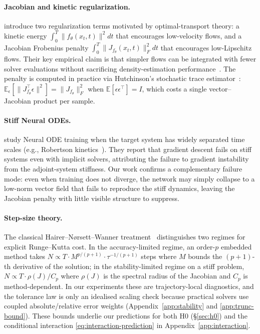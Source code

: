 \documentclass[11pt]{article}
\theoremstyle{plain}
\theoremstyle{definition}
\newcommand{\E}{\mathbb{E}}
\newcommand{\fjac}{J_{f_\theta}}
\begin{document}
\paragraph{Jacobian and kinetic regularization.}
\citet{finlay2020train} introduce two regularization terms motivated by
optimal-transport theory: a kinetic energy $\int_0^T \|f_\theta(x_t, t)\|^2 dt$
that encourages low-velocity flows, and a Jacobian Frobenius penalty
$\int_0^T \|\fjac(x_t, t)\|_F^2 dt$ that encourages low-Lipschitz flows. Their
key empirical claim is that simpler flows can be integrated with fewer solver
evaluations without sacrificing density-estimation
performance~\citep{grathwohl2019ffjord}. The penalty is computed in practice
via Hutchinson's stochastic trace estimator~\citep{hutchinson1990stochastic}:
$\E_\epsilon[\|\fjac^\top \epsilon\|^2] = \|\fjac\|_F^2$ when
$\E[\epsilon\epsilon^\top] = I$, which costs a single vector--Jacobian product
per sample.

\paragraph{Stiff Neural ODEs.}
\citet{kim2021stiff} study Neural ODE training when the target system has
widely separated time scales (e.g., Robertson kinetics~\citep{robertson1966solution}).
They report that gradient descent fails on stiff systems even with implicit
solvers, attributing the failure to gradient instability from the
adjoint-system stiffness. Our work confirms a complementary failure mode:
even when training does not diverge, the network may simply collapse to a
low-norm vector field that fails to reproduce the stiff dynamics, leaving the
Jacobian penalty with little visible structure to suppress.

\paragraph{Step-size theory.}
The classical Hairer--N\o{}rsett--Wanner treatment~\citep{hairer1993solving,
hairer1996solving} distinguishes two regimes for explicit Runge--Kutta cost.
In the accuracy-limited regime, an order-$p$ embedded method takes
$N \propto T \cdot M^{p/(p+1)} \cdot \tau^{-1/(p+1)}$ steps where $M$ bounds
the $(p{+}1)$-th derivative of the solution; in the stability-limited regime
on a stiff problem, $N \propto T \cdot \rho(J)/C_p$ where $\rho(J)$ is the
spectral radius of the Jacobian and $C_p$ is method-dependent. In our
experiments these are trajectory-local diagnostics, and the tolerance law is
only an idealised scaling check because practical solvers use coupled
absolute/relative error weights (Appendix~\ref{app:stability} and
\ref{app:trunc-bound}). These bounds underlie our predictions for both H0
(\S\ref{sec:h0}) and the conditional interaction
\eqref{eq:interaction-prediction} in Appendix~\ref{app:interaction}.
\end{document}
